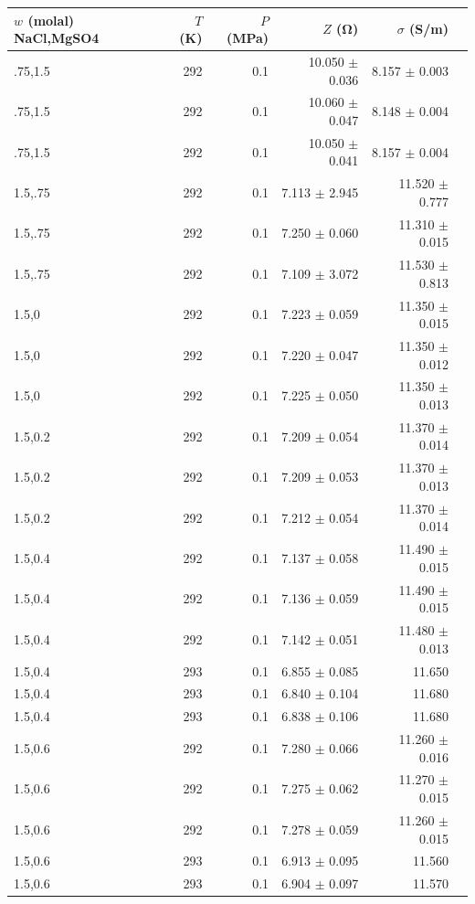 \begin{table}[ht]
\centering
\begin{tabular}{lrrrrr}
\hline
$w$ (molal) NaCl,MgSO4 & $T$ (K) & $P$ (MPa) & $Z$ (\si{\ohm}) & $\sigma$ (\si{S/m}) \\
\hline
.75,1.5 & 292 & 0.1 & 10.050 $\pm$ 0.036 & 8.157 $\pm$ 0.003 \\
.75,1.5 & 292 & 0.1 & 10.060 $\pm$ 0.047 & 8.148 $\pm$ 0.004 \\
.75,1.5 & 292 & 0.1 & 10.050 $\pm$ 0.041 & 8.157 $\pm$ 0.004 \\
1.5,.75 & 292 & 0.1 & 7.113 $\pm$ 2.945 & 11.520 $\pm$ 0.777 \\
1.5,.75 & 292 & 0.1 & 7.250 $\pm$ 0.060 & 11.310 $\pm$ 0.015 \\
1.5,.75 & 292 & 0.1 & 7.109 $\pm$ 3.072 & 11.530 $\pm$ 0.813 \\
1.5,0 & 292 & 0.1 & 7.223 $\pm$ 0.059 & 11.350 $\pm$ 0.015 \\
1.5,0 & 292 & 0.1 & 7.220 $\pm$ 0.047 & 11.350 $\pm$ 0.012 \\
1.5,0 & 292 & 0.1 & 7.225 $\pm$ 0.050 & 11.350 $\pm$ 0.013 \\
1.5,0.2 & 292 & 0.1 & 7.209 $\pm$ 0.054 & 11.370 $\pm$ 0.014 \\
1.5,0.2 & 292 & 0.1 & 7.209 $\pm$ 0.053 & 11.370 $\pm$ 0.013 \\
1.5,0.2 & 292 & 0.1 & 7.212 $\pm$ 0.054 & 11.370 $\pm$ 0.014 \\
1.5,0.4 & 292 & 0.1 & 7.137 $\pm$ 0.058 & 11.490 $\pm$ 0.015 \\
1.5,0.4 & 292 & 0.1 & 7.136 $\pm$ 0.059 & 11.490 $\pm$ 0.015 \\
1.5,0.4 & 292 & 0.1 & 7.142 $\pm$ 0.051 & 11.480 $\pm$ 0.013 \\
1.5,0.4 & 293 & 0.1 & 6.855 $\pm$ 0.085 & 11.650 \\
1.5,0.4 & 293 & 0.1 & 6.840 $\pm$ 0.104 & 11.680 \\
1.5,0.4 & 293 & 0.1 & 6.838 $\pm$ 0.106 & 11.680 \\
1.5,0.6 & 292 & 0.1 & 7.280 $\pm$ 0.066 & 11.260 $\pm$ 0.016 \\
1.5,0.6 & 292 & 0.1 & 7.275 $\pm$ 0.062 & 11.270 $\pm$ 0.015 \\
1.5,0.6 & 292 & 0.1 & 7.278 $\pm$ 0.059 & 11.260 $\pm$ 0.015 \\
1.5,0.6 & 293 & 0.1 & 6.913 $\pm$ 0.095 & 11.560 \\
1.5,0.6 & 293 & 0.1 & 6.904 $\pm$ 0.097 & 11.570 \\

\end{tabular}
\end{table}
